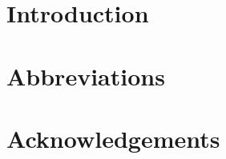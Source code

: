 \documentclass[output=paper]{langsci/langscibook}
\author{\affiliation{}}
\title{}
\begin{document}
\section{Introduction} 
 
\section*{Abbreviations}
\section*{Acknowledgements}

\sloppy
\printbibliography[heading=subbibliography,notkeyword=this] 
\end{document}
